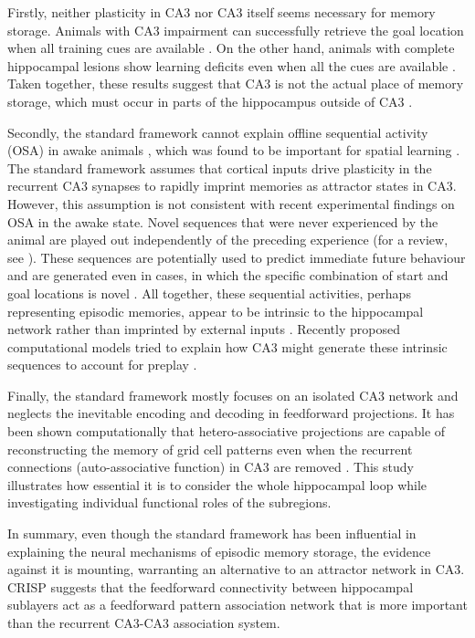 \documentclass[utf8]{frontiersSCNS} %
\begin{document}
Firstly, neither plasticity in CA3 nor CA3 itself seems necessary for memory storage. Animals with CA3 impairment can successfully retrieve the goal location when all training cues are available \cite{nakazawa2002requirement, gold2005role, fellini2009pharmacological}. On the other hand, animals with complete hippocampal lesions show learning deficits even when all the cues are available \cite{gilbert1998memory, morris1982place}. Taken together, these results suggest that CA3 is not the actual place of memory storage, which must occur in parts of the hippocampus outside of CA3 \cite{cheng2013crisp}. 

Secondly, the standard framework cannot explain offline sequential activity (OSA) in awake animals \cite{cheng2013crisp}, which was found to be important for spatial learning \cite{jadhav2012awake}. The standard framework assumes that cortical inputs drive plasticity in the recurrent CA3 synapses to rapidly imprint memories as attractor states in CA3. However, this assumption is not consistent with recent experimental findings on OSA in the awake state. Novel sequences that were never experienced by the animal are played out independently of the preceding experience \cite{gupta2010hippocampal} (for a review, see \cite{dragoi2011preplay}). These sequences are potentially used to predict immediate future behaviour and are generated even in cases, in which the specific combination of start and goal locations is novel \cite{pfeiffer2013hippocampal}. All together, these sequential activities, perhaps representing episodic memories, appear to be intrinsic to the hippocampal network rather than imprinted by external inputs \cite{cheng2013crisp}. Recently proposed computational models tried to explain how CA3 might generate these intrinsic sequences to account for preplay \cite{azizi2013computational, romani2015short}. 


Finally, the standard framework mostly focuses on an isolated CA3 network and neglects the inevitable encoding and decoding in feedforward projections. It has been shown computationally that hetero-associative projections are capable of reconstructing the memory of grid cell patterns even when the recurrent connections (auto-associative function) in CA3 are removed \cite{neher2015memory}. This study illustrates how essential it is to consider the whole hippocampal loop while investigating individual functional roles of the subregions. 

In summary, even though the standard framework has been influential in explaining the neural mechanisms of episodic memory storage, the evidence against it is mounting, warranting an alternative to an attractor network in CA3. CRISP suggests that the feedforward connectivity between hippocampal sublayers act as a feedforward pattern association network that is more important than the recurrent CA3-CA3 association system. 
\end{document}
